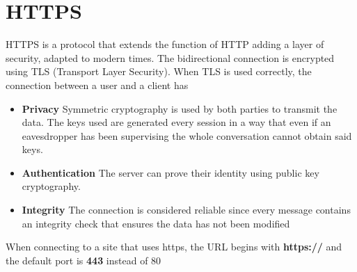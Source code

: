 \section{HTTPS}

HTTPS is a protocol that extends the function of HTTP adding a layer of security, adapted to modern times. The bidirectional connection is encrypted using TLS (Transport Layer Security).
When TLS is used correctly, the connection between a user and a client has
\begin{itemize}
	\item \textbf{Privacy} Symmetric cryptography is used by both parties to transmit the data. The keys used are generated every session in a way that even if an eavesdropper has been supervising the  whole conversation cannot obtain said keys.
	\item \textbf{Authentication} The server can prove their identity using public key cryptography.
	\item \textbf{Integrity} The connection is considered reliable since every message contains an integrity check that ensures the data has not been modified
\end{itemize}
When connecting to a site that uses https, the URL begins with \textbf{https://} and the default port is \textbf{443} instead of 80


